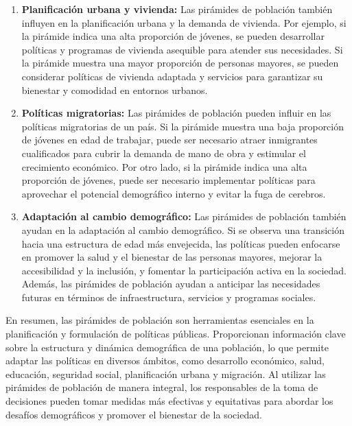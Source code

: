 \documentclass[8pt,a4paper]{beamer}
\begin{document}
{\begin{frame}{}
\begin{block}{}
\justifying

\begin{enumerate}
\justifying
\item[\ding{102}] \textbf{Planificación urbana y vivienda:} Las pirámides de población también influyen en la planificación urbana y la demanda de vivienda. Por ejemplo, si la pirámide indica una alta proporción de jóvenes, se pueden desarrollar políticas y programas de vivienda asequible para atender sus necesidades. Si la pirámide muestra una mayor proporción de personas mayores, se pueden considerar políticas de vivienda adaptada y servicios para garantizar su bienestar y comodidad en entornos urbanos.

\item[\ding{102}] \textbf{Políticas migratorias:} Las pirámides de población pueden influir en las políticas migratorias de un país. Si la pirámide muestra una baja proporción de jóvenes en edad de trabajar, puede ser necesario atraer inmigrantes cualificados para cubrir la demanda de mano de obra y estimular el crecimiento económico. Por otro lado, si la pirámide indica una alta proporción de jóvenes, puede ser necesario implementar políticas para aprovechar el potencial demográfico interno y evitar la fuga de cerebros.

\item[\ding{102}] \textbf{Adaptación al cambio demográfico:} Las pirámides de población también ayudan en la adaptación al cambio demográfico. Si se observa una transición hacia una estructura de edad más envejecida, las políticas pueden enfocarse en promover la salud y el bienestar de las personas mayores, mejorar la accesibilidad y la inclusión, y fomentar la participación activa en la sociedad. Además, las pirámides de población ayudan a anticipar las necesidades futuras en términos de infraestructura, servicios y programas sociales.
\end{enumerate}
\end{block}
\end{frame}

\begin{frame}{}
\begin{block}{}
\justifying
En resumen, las pirámides de población son herramientas esenciales en la planificación y formulación de políticas públicas. Proporcionan información clave sobre la estructura y dinámica demográfica de una población, lo que permite adaptar las políticas en diversos ámbitos, como desarrollo económico, salud, educación, seguridad social, planificación urbana y migración. Al utilizar las pirámides de población de manera integral, los responsables de la toma de decisiones pueden tomar medidas más efectivas y equitativas para abordar los desafíos demográficos y promover el bienestar de la sociedad.
\end{block}
\end{frame}

}
\end{document}
